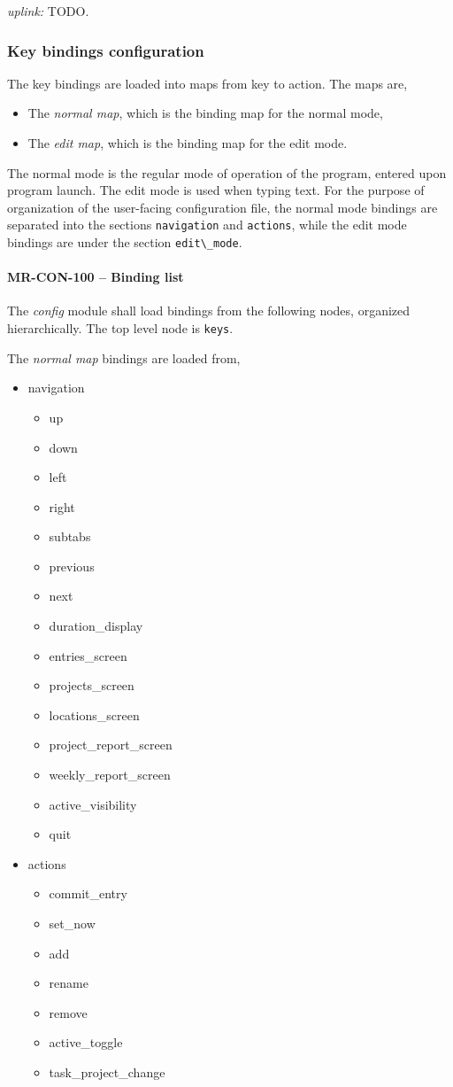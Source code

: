 \textit{uplink: } TODO.

\subsubsection{Key bindings configuration}
The key bindings are loaded into maps from key to action. The maps are,
\begin{itemize}
\item The \emph{normal map}, which is the binding map for the normal mode,
\item The \emph{edit map}, which is the binding map for the edit mode.
\end{itemize}

The normal mode is the regular mode of operation of the program, entered
upon program launch. The edit mode is used when typing text.
For the purpose of organization of the user-facing configuration file,
the normal mode bindings are separated into the sections \lstinline{navigation}
and \lstinline{actions}, while the edit mode bindings are under the section
\lstinline{edit\_mode}.

\paragraph{MR-CON-100 -- Binding list}
The \emph{config} module shall load bindings from the following nodes,
organized hierarchically. The top level node is \lstinline{keys}.

The \emph{normal map} bindings are loaded from,
\begin{itemize}
\item navigation
  \begin{itemize}
  \item up
  \item down
  \item left
  \item right
  \item subtabs
  \item previous
  \item next
  \item duration\_display
  \item entries\_screen
  \item projects\_screen
  \item locations\_screen
  \item project\_report\_screen
  \item weekly\_report\_screen
  \item active\_visibility
  \item quit
  \end{itemize}
\item actions
  \begin{itemize}
  \item commit\_entry
  \item set\_now
  \item add
  \item rename
  \item remove
  \item active\_toggle
  \item task\_project\_change
  \end{itemize}
\end{itemize}

